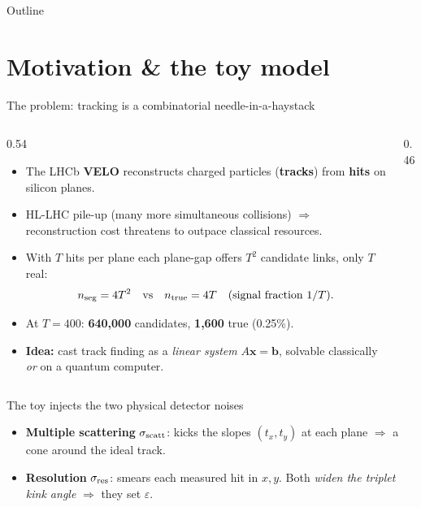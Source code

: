 \begin{frame}{Outline}
  \tableofcontents
\end{frame}

\section{Motivation \& the toy model}
\begin{frame}{The problem: tracking is a combinatorial needle-in-a-haystack}
  \begin{columns}[T]
    \begin{column}{0.54\textwidth}
      \begin{itemize}
        \item The LHCb \textbf{VELO} reconstructs charged particles (\textbf{tracks}) from \textbf{hits} on silicon planes.
        \item HL-LHC pile-up (many more simultaneous collisions) $\Rightarrow$ reconstruction cost threatens to outpace classical resources.
        \item With $T$ hits per plane each plane-gap offers $T^2$ candidate links, only $T$ real:
        \[ n_{\rm seg}=4T^2 \quad\text{vs}\quad n_{\rm true}=4T \quad(\text{signal fraction } 1/T).\]
        \item At $T{=}400$: \textbf{640{,}000} candidates, \textbf{1{,}600} true (0.25\%).
        \item \textbf{Idea:} cast track finding as a \emph{linear system} $A\mathbf{x}=\mathbf{b}$, solvable classically \emph{or} on a quantum computer.
      \end{itemize}
    \end{column}
    \begin{column}{0.46\textwidth}
      \centering{}
    \end{column}
  \end{columns}
\end{frame}

\begin{frame}{The toy injects the two physical detector noises}
  \centering
  \begin{itemize}
    \item \textbf{Multiple scattering} $\sigma_{\rm scatt}$: kicks the slopes $(t_x,t_y)$ at each plane $\Rightarrow$ a cone around the ideal track.
    \item \textbf{Resolution} $\sigma_{\rm res}$: smears each measured hit in $x,y$. \quad Both \emph{widen the triplet kink angle} $\Rightarrow$ they set $\varepsilon$.
  \end{itemize}
\end{frame}

